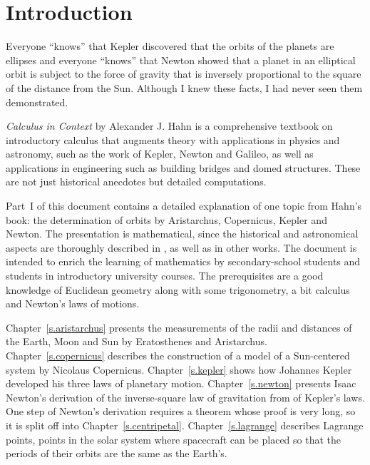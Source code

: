 \newpage

\tableofcontents

\newpage


\chapter{Introduction}

Everyone ``knows'' that Kepler discovered that the orbits of the planets are ellipses and everyone ``knows'' that Newton showed that a planet in an elliptical orbit is subject to the force of gravity that is inversely proportional to the square of the distance from the Sun. Although I knew these facts, I had never seen them demonstrated.

\textit{Calculus in Context} \cite{hahn-cic} by Alexander J. Hahn is a comprehensive textbook on introductory calculus that augments theory with  applications in physics and astronomy, such as the work of Kepler, Newton and Galileo, as well as applications in engineering such as building bridges and domed structures. These are not just historical anecdotes but detailed computations.

Part~I of this document contains a detailed explanation of one topic from Hahn's book: the determination of orbits by Aristarchus, Copernicus, Kepler and Newton. The presentation is mathematical, since the historical and astronomical aspects are thoroughly described in \cite{hahn-cic}, as well as in other works. The document is intended to enrich the learning of mathematics by secondary-school students and students in introductory university courses. The prerequisites are a good knowledge of Euclidean geometry along with some trigonometry, a bit calculus and Newton's laws of motions.

Chapter~\ref{s.aristarchus} presents the measurements of the radii and distances of the Earth, Moon and Sun by Eratosthenes and Aristarchus. Chapter~\ref{s.copernicus} describes the construction of a model of a Sun-centered system by Nicolaus Copernicus. Chapter~\ref{s.kepler} shows how Johannes Kepler developed his three laws of planetary motion. Chapter~\ref{s.newton} presents Isaac Newton's derivation of the inverse-square law of gravitation from of Kepler's laws. One step of Newton's derivation requires a theorem whose proof is very long, so it is split off into Chapter~\ref{s.centripetal}. Chapter~\ref{s.lagrange} describes Lagrange points, points in the solar system where spacecraft can be placed so that the periods of their orbits are the same as the Earth's.

